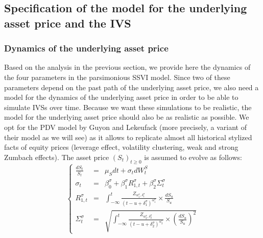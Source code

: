 \subsection{Specification of the model for the underlying asset price and the IVS}\label{sec:dynamics_specification}
\subsubsection{Dynamics of the underlying asset price}
Based on the analysis in the previous section, we provide here the dynamics of the four parameters in the parsimonious SSVI model. Since two of these parameters depend on the past path of the underlying asset price, we also need a model for the dynamics of the underlying asset price in order to be able to simulate IVSs over time. Because we want these simulations to be realistic, the model for the underlying asset price should also be as realistic as possible. We opt for the PDV model by Guyon and Lekeufack (more precisely, a variant of their model as we will see) as it allows to replicate almost all historical stylized facts of equity prices (leverage effect, volatility clustering, weak and strong Zumbach effects). The asset price $(S_t)_{t\ge 0}$ is assumed to evolve as follows:
\begin{equation}\label{eq:underlying_dynamics}
    \left\{ 
    \begin{array}{rcl}
        \displaystyle\frac{dS_t}{S_t} &=& \mu_Sdt + \sigma_t dW^S_t \\
        \sigma_t &=&  \beta_0^{\sigma} + \beta_1^{\sigma} R^{\sigma}_{1,t}+\beta_2^{\sigma} \Sigma_t^{\sigma} \\
        R_{1,t}^{\sigma} &=& \displaystyle\int_{-\infty}^t \frac{Z_{\alpha_1^{\sigma},\delta_1^{\sigma}}}{(t-u+\delta_1^{\sigma})^{\alpha_1^{\sigma}}}\times \frac{dS_u}{S_u} \\
        \Sigma_t^{\sigma} &=& \sqrt{\displaystyle\int_{-\infty}^t \frac{Z_{\alpha_2^{\sigma},\delta_2^{\sigma}}}{(t-u+\delta_2^{\sigma})^{\alpha_2^{\sigma}}}\times\left(\frac{dS_u}{S_u}\right)^2}
    \end{array}
    \right.
\end{equation}
